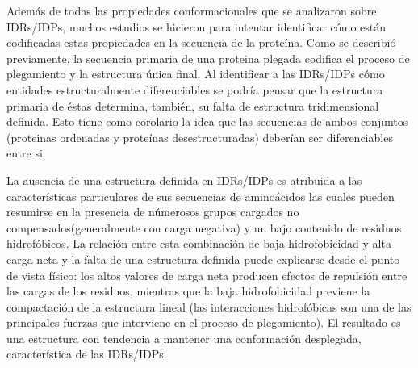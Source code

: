 


Además de todas las propiedades conformacionales que se analizaron sobre IDRs/IDPs,
muchos estudios se hicieron para intentar identificar cómo están codificadas estas propiedades en la secuencia de la proteína.
Como se describió previamente, la secuencia primaria de una proteina plegada codifica el proceso de plegamiento y la estructura única final. 
Al identificar a las IDRs/IDPs cómo entidades estructuralmente diferenciables se podría pensar que la estructura primaria de éstas determina, también, su falta de estructura tridimensional definida.
Esto tiene como corolario la idea que las secuencias de ambos conjuntos (proteinas ordenadas y proteínas desestructuradas) deberían ser diferenciables entre si.

La ausencia de una estructura definida en IDRs/IDPs es atribuida a las características particulares de sus secuencias de aminoácidos las cuales pueden resumirse en la presencia de númerosos 
grupos cargados no compensados(generalmente con carga negativa) y un bajo contenido de residuos hidrofóbicos.
La relación entre esta combinación de baja hidrofobicidad y alta carga neta y la falta de una estructura definida puede explicarse desde el punto de vista físico:
los altos valores de carga neta producen efectos de repulsión entre las cargas de los residuos, mientras que la baja hidrofobicidad previene la compactación de la estructura lineal
(las interacciones hidrofóbicas son una de las principales fuerzas que interviene en el proceso de plegamiento).
El resultado es una estructura con tendencia a mantener una conformación desplegada, característica de las IDRs/IDPs.

